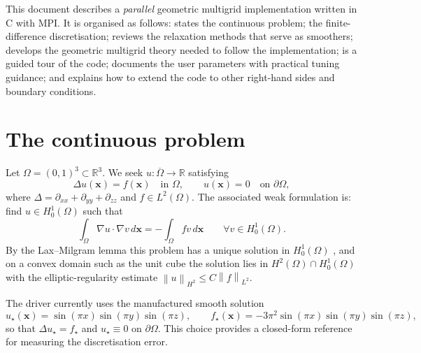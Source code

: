 \documentclass[11pt]{article}
\theoremstyle{definition}
\newcommand{\R}{\mathbb{R}}
\newcommand{\bx}{\mathbf{x}}
\newcommand{\norm}[1]{\left\lVert #1 \right\rVert}
\begin{document}
This document describes a \emph{parallel} geometric multigrid implementation
written in C with MPI.  It is organised as follows:
 states the continuous problem;
 the finite-difference discretisation;
 reviews the relaxation methods that serve as
smoothers;  develops the geometric multigrid theory
needed to follow the implementation;  is a
guided tour of the code;  documents the user
parameters with practical tuning guidance; and 
explains how to extend the code to other right-hand sides and boundary
conditions.

\section{The continuous problem}\label{sec:problem}

Let $\Omega = (0,1)^3 \subset \R^3$.  We seek $u\colon\overline{\Omega}\to\R$
satisfying
\begin{equation}\label{eq:poisson}
  \Delta u(\bx) = f(\bx)\quad \text{in } \Omega,\qquad
  u(\bx) = 0 \quad \text{on } \partial\Omega,
\end{equation}
where $\Delta = \partial_{xx} + \partial_{yy} + \partial_{zz}$ and $f \in
L^2(\Omega)$.  The associated weak formulation is: find $u\in H^1_0(\Omega)$ such
that
\begin{equation}\label{eq:weak}
  \int_\Omega \nabla u \cdot \nabla v \,d\bx
  = -\int_\Omega f v \, d\bx
  \qquad \forall v \in H^1_0(\Omega).
\end{equation}
By the Lax--Milgram lemma this problem has a unique solution in $H^1_0(\Omega)$
\cite[Ch.~6]{evans2010pde}, and on a convex domain such as the unit cube
the solution lies in $H^2(\Omega)\cap H^1_0(\Omega)$ with the elliptic-regularity
estimate $\norm{u}_{H^2}\le C \norm{f}_{L^2}$.

The driver currently uses the manufactured smooth solution
\begin{equation}\label{eq:manufactured}
  u_\star(\bx) = \sin(\pi x)\sin(\pi y)\sin(\pi z),\qquad
  f_\star(\bx) = -3\pi^2 \sin(\pi x)\sin(\pi y)\sin(\pi z),
\end{equation}
so that $\Delta u_\star = f_\star$ and $u_\star \equiv 0$ on $\partial\Omega$.
This choice provides a closed-form reference for measuring the
discretisation error.
\end{document}
